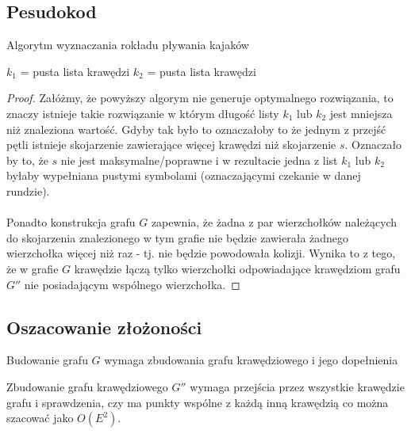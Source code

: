 \documentclass{llncs}
\begin{document}
\subsection{Pesudokod}
\begin{algorithm}[H]
 \caption{Algorytm wyznaczania rokładu pływania kajaków}
 $k_1$ = pusta lista krawędzi\;
 $k_2$ = pusta lista krawędzi\;
\end{algorithm}

\begin{proof}
Załóżmy, że powyższy algorym nie generuje optymalnego rozwiązania, to znaczy istnieje
takie rozwiązanie w którym długość listy $k_1$ lub $k_2$ jest mniejsza niż znaleziona wartość.
Gdyby tak było to oznaczałoby to że jednym z przejść pętli istnieje
skojarzenie zawierające więcej krawędzi niż skojarzenie $s$. 
Oznaczało by to, że $s$ nie jest maksymalne/poprawne i w rezultacie jedna z list $k_1$ lub $k_2$ byłaby wypełniana pustymi
symbolami (oznaczającymi czekanie w danej rundzie). 
\\\\
Ponadto konstrukcja grafu $G$ zapewnia, że żadna z par wierzchołków należących do skojarzenia znalezionego w tym grafie nie będzie zawierała żadnego wierzchołka więcej niż raz - tj. nie będzie powodowała kolizji. Wynika to z tego, że w grafie $G$ krawędzie łączą tylko wierzchołki odpowiadające krawędziom grafu $G''$ nie posiadającym wspólnego wierzchołka.
\end{proof}

\subsection{Oszacowanie złożoności}
Budowanie grafu $G$ wymaga zbudowania grafu krawędziowego i jego dopełnienia


Zbudowanie grafu krawędziowego $G''$
wymaga przejścia przez wszystkie krawędzie grafu i sprawdzenia, czy ma punkty wspólne z każdą inną krawędzią co można 
szacować jako $O(E^2)$. 
\end{document}
